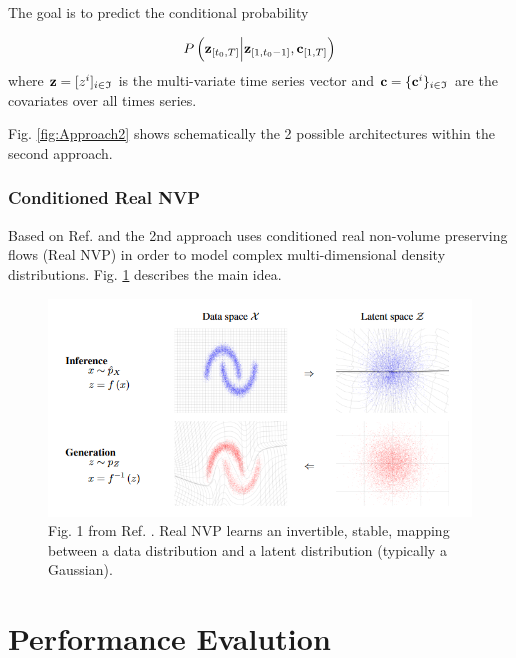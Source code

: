 \documentclass[11pt,headings=small]{scrartcl}
\begin{document}
The goal is to predict the conditional probability 

\begin{equation}\label{condprob}
P \left( \textbf{z}_{[t_{0},T]} \Big| \textbf{z}_{[1,t_{0}-1]} , \textbf{c}_{[1,T]} \right)
\end{equation}
where $\textbf{z} = [z^{i}]_{i\in\frak{I}}$ is the multi-variate time series vector and $\textbf{c}=\{\textbf{c}^{i}\}_{i\in\frak{I}}$ are the covariates over all times series.

Fig. \ref{fig:Approach2} shows schematically the 2 possible architectures within the second approach.



\subsubsection{Conditioned Real NVP}
\label{subsection:approach2condflow}
 
Based on Ref. \cite{papamakarios2018masked} and \cite{DBLP:journals/corr/DinhSB16} the 2nd approach uses conditioned real non-volume preserving flows (Real NVP) in order to model complex multi-dimensional density distributions. Fig. \ref{fig:RealNVP} describes the main idea.

\begin{figure}
	\centering
	\includegraphics[width=.9\linewidth]{pics/RealNVP.png}
	\caption{Fig. 1 from Ref. \cite{DBLP:journals/corr/DinhSB16}. Real NVP learns an invertible, stable, mapping between a data distribution and a latent distribution (typically a Gaussian).}
	\label{fig:RealNVP}
\end{figure}



\section{Performance Evalution}
\label{section:Perf}
\end{document}
